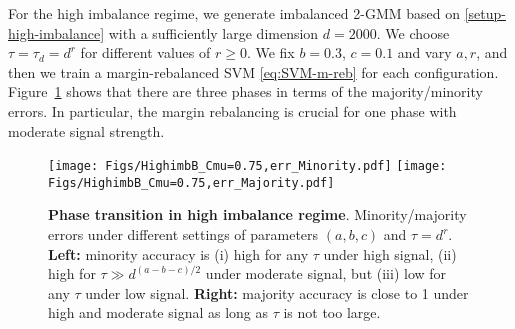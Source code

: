 For the high imbalance regime, we generate imbalanced 2-GMM based on \cref{setup-high-imbalance} with a sufficiently large dimension $d=2000$. We choose $\tau = \tau_d = d^r$ for different values of $r \ge 0$. We fix $b = 0.3$, $c = 0.1$ and vary $a, r$, and then we train a margin-rebalanced SVM \cref{eq:SVM-m-reb} for each configuration. Figure~\ref{fig:High_imb_heat} shows that there are three phases in terms of the majority/minority errors. In particular, the margin rebalancing is crucial for one phase with moderate signal strength. 


\begin{figure}[t]
    \centering
    \texttt{[image: Figs/HighimbB\_Cmu=0.75,err\_Minority.pdf]}
    \texttt{[image: Figs/HighimbB\_Cmu=0.75,err\_Majority.pdf]}
    \caption{
        \textbf{Phase transition in high imbalance regime}. Minority/majority errors  under different settings of parameters $(a, b, c)$ and $\tau = d^r$. \textbf{Left:} minority accuracy is (i) high for any $\tau$ under high signal, (ii) high for $\tau \gg d^{(a - b - c)/2}$ under moderate signal, but (iii) low for any $\tau$ under low signal. 
        \textbf{Right:} majority accuracy is close to 1 under high and moderate signal as long as $\tau$ is not too large.   
    }
    \label{fig:High_imb_heat}
\end{figure}

